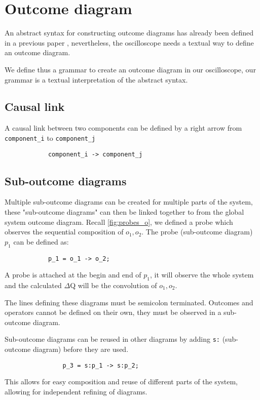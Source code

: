   \section{Outcome diagram}
        An abstract syntax for constructing outcome diagrams has already been defined in a previous paper \cite{art}, nevertheless, the oscilloscope needs a textual way to define an outcome diagram. 
       
        We define thus a grammar to create an outcome diagram in our oscilloscope, our grammar is a textual interpretation of the abstract syntax.
        
      
        \subsection{Causal link}
            A causal link between two components can be defined by a right arrow from \texttt{component\_i} to \texttt{component\_j}
        \begin{verbatim}
            component_i -> component_j 
        \end{verbatim}
        
        \subsection{Sub-outcome diagrams }
            Multiple sub-outcome diagrams can be created for multiple parts of the system, these "sub-outcome diagrams" can then be linked together to from the global system outcome diagram.  
        Recall \cref{fig:probes_o}, we defined a probe which observes the sequential composition of $o_1, o_2$. The probe (sub-outcome diagram) $p_1$ can be defined as:
        \begin{verbatim}
            p_1 = o_1 -> o_2;
        \end{verbatim}

        A probe is attached at the begin and end of $p_1$, it will observe the whole system and the calculated $\Delta$Q will be the convolution of $o_1, o_2$.

        The lines defining these diagrams must be semicolon terminated. Outcomes and operators cannot be defined on their own, they must be observed in a sub-outcome diagram.
        
        Sub-outcome diagrams can be reused in other diagrams by adding \texttt{s:} (sub-outcome diagram) before they are used.

            \begin{verbatim}
                p_3 = s:p_1 -> s:p_2;
            \end{verbatim}
            This allows for easy composition and reuse of different parts of the system, allowing for independent refining of diagrams.

